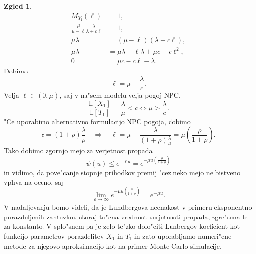 \documentclass[12pt, a4paper, reqno]{amsart}
\theoremstyle{definition}
\newtheorem{zgled}[definicija]{Zgled}
\theoremstyle{plain}
\newcommand{\E}{\mathbb{E}}
\newcommand{\1}{\mathds{1}}
\begin{document}
\begin{zgled}
                \begin{align*}
                    M_{Y_1}(\ell) &= 1, \\
                    \frac{\mu}{\mu - \ell}\frac{\lambda}{\lambda + c\ell} &= 1, \\
                    \mu\lambda &= (\mu - \ell)(\lambda + c\ell), \\
                    \mu\lambda &= \mu\lambda - \ell\lambda + \mu c - c\ell^2, \\
                    0 &= \mu c - c\ell - \lambda.
                \end{align*}
                Dobimo 
                \begin{equation}
                    \ell = \mu - \frac{\lambda}{c}.
                    \label{eq:LundbergovKoeficientExpPrva}
                \end{equation}
                Velja $\ell \in (0, \mu)$, saj v na"sem modelu velja pogoj NPC,
                \begin{equation*}
                    \frac{\E\left[X_1\right]}{\E\left[T_1\right]} = \frac{\lambda}{\mu} < c \iff \mu > \frac{\lambda}{c}.
                \end{equation*}
                "Ce uporabimo alternativno formulacijo NPC pogoja, dobimo
                \begin{equation}
                    c = (1 + \rho)\frac{\lambda}{\mu} \quad \Rightarrow \quad
                    \ell = \mu - \frac{\lambda}{(1 + \rho)\frac{\lambda}{\mu}} = \mu\left(\frac{\rho}{1 + \rho}\right).
                    \label{eq:LundbergovKoeficientExp}
                \end{equation}
                Tako dobimo zgornjo mejo za verjetnost propada
                \begin{equation*}
                    \psi(u) \leq e^{-\ell u} = e^{-\mu u\left(\frac{\rho}{1 + \rho}\right)}
                \end{equation*}
                in vidimo, da pove"canje stopnje prihodkov premij "cez neko mejo ne bistveno 
                vpliva na oceno, saj 
                \begin{equation*}
                    \lim_{\rho\to\infty}e^{-\mu u\left(\frac{\rho}{1 + \rho}\right)} = e^{-\mu u}.
                \end{equation*}
                V nadaljevanju bomo videli, da je Lundbergova neenakost v primeru eksponentno 
                porazdeljenih zahtevkov skoraj to"cna vrednost verjetnosti propada, zgre"sena le za konstanto.
                V splo"snem pa je zelo te"zko dolo"citi Lunbergov koeficient kot funkcijo parametrov
                porazdelitev $X_1$ in $T_1$ in zato uporabljamo numeri"cne metode za njegovo aproksimacijo 
                kot na primer Monte Carlo simulacije. 
                \label{zgd:LundebrgovaNeenakostEksponentno}
            \end{zgled}
\end{document}
